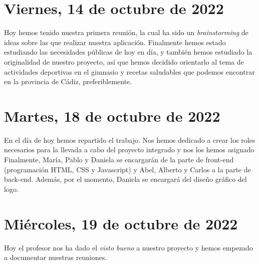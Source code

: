 \documentclass[12pt]{article}
\begin{document}
\section{Viernes, 14 de octubre de 2022}
\large Hoy hemos tenido nuestra primera reunión, la cual ha sido un \emph{brainstorming} de ideas sobre las que realizar nuestra aplicación. Finalmente hemos estado estudiando las necesidades públicas de hoy en día, y también hemos estudiado la originalidad de nuestro proyecto, así que hemos decidido orientarlo al tema de actividades deportivas en el gimnasio y recetas saludables que podemos encontrar en la provincia de Cádiz, preferiblemente. \par

\section{Martes, 18 de octubre de 2022}
\large En el día de hoy hemos repartido el trabajo. Nos hemos dedicado a crear los roles necesarios para la llevada a cabo del proyecto integrado y nos los hemos asignado \newline Finalmente, María, Pablo y Daniela se encargarán de la parte de front-end (programación HTML, CSS y Javascript) y Abel, Alberto y Carlos a la parte de back-end. Además, por el momento, Daniela se encargará del diseño gráfico del logo.

\section{Miércoles, 19 de octubre de 2022}
\large Hoy el profesor nos ha dado el \emph{visto bueno} a nuestro proyecto y hemos empezado a documentar nuestras reuniones.
\end{document}
